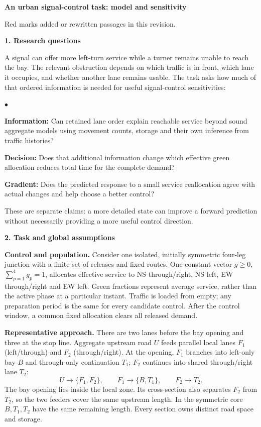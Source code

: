 \documentclass[10pt,a4paper]{article}
\newcommand{\head}[1]{\par\vspace{4pt}\noindent\textbf{#1}\par\nobreak\vspace{1pt}}
\newenvironment{points}{\begin{list}{$\bullet$}{%
 \setlength{\leftmargin}{1.4em}\setlength{\labelwidth}{0.7em}%
 \setlength{\labelsep}{0.4em}\setlength{\itemsep}{2pt}%
 \setlength{\parsep}{0pt}\setlength{\topsep}{3pt}}}{\end{list}}
\begin{document}
\begin{center}
{\large\bfseries An urban signal-control task: model and sensitivity}
\end{center}
\vspace{-5pt}
{\small\color{revisionred}Red marks added or rewritten passages in this revision.}\par

\head{1. Research questions}
A signal can offer more left-turn service while a turner remains unable
to reach the bay. The relevant obstruction depends on which traffic is
in front, which lane it occupies, and whether another lane remains usable.
The task asks how much of that ordered information is needed for useful
signal-control sensitivities:
\begin{points}
\item \textbf{Information:} Can retained lane order explain reachable
service beyond sound aggregate models using movement counts, storage
and their own inference from traffic histories?
\item \textbf{Decision:} Does that additional information change which
effective green allocation reduces total time for the complete demand?
\item \textbf{Gradient:} Does the predicted response to a small service
reallocation agree with actual changes and help choose a better control?
\end{points}
These are separate claims: a more detailed state can improve a forward
prediction without necessarily providing a more useful control direction.

\head{2. Task and global assumptions}
\textbf{Control and population.} Consider one isolated, initially symmetric
four-leg junction with a finite set of releases and fixed routes.
One constant vector $g\geq0$, $\sum_{p=1}^4g_p=1$, allocates effective
service to NS through/right, NS left, EW through/right and EW left.
Green fractions represent average service, rather than the active phase
at a particular instant. Traffic is loaded from empty; any preparation
period is the same for every candidate control. After the control window,
a common fixed allocation clears all released demand.

\textbf{Representative approach.} There are two lanes before the bay
opening and three at the stop line. Aggregate upstream road $U$ feeds
parallel local lanes $F_1$ (left/through) and $F_2$ (through/right).
At the opening, $F_1$ branches into left-only bay $B$ and through-only
continuation $T_1$; $F_2$ continues into shared through/right lane $T_2$:
\[
 U\longrightarrow\{F_1,F_2\},\qquad
 F_1\longrightarrow\{B,T_1\},\qquad F_2\longrightarrow T_2.
\]
The bay opening lies inside the local zone. Its cross-section also
separates $F_2$ from $T_2$, so the two feeders cover the same upstream
length. In the symmetric core $B,T_1,T_2$ have the same remaining length.
Every section owns distinct road space and storage.
\end{document}

